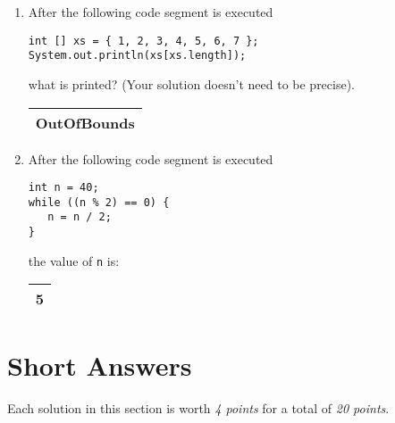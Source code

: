 \documentclass[12pt]{report}
\newcommand{\Ans}[1]{\hfill {\Huge\begin{tabular}{|c|} \hline \hfill #1\\ \hline \end{tabular}} }
\begin{document}
\begin{enumerate}
\item After the following code segment is executed
\begin{verbatim}
int [] xs = { 1, 2, 3, 4, 5, 6, 7 };
System.out.println(xs[xs.length]);
\end{verbatim}
what is printed? (Your solution doesn't need to be precise). \Ans{\large{OutOfBounds}}

\item After the following code segment is executed
\begin{verbatim}
int n = 40; 
while ((n % 2) == 0) {
   n = n / 2;
}
\end{verbatim}
the value of \texttt{n} is: \Ans{5}

\end{enumerate}

\clearpage
\section*{Short Answers}
Each solution in this section is worth \emph{4 points} for a total of \emph{20 points}.
\end{document}
